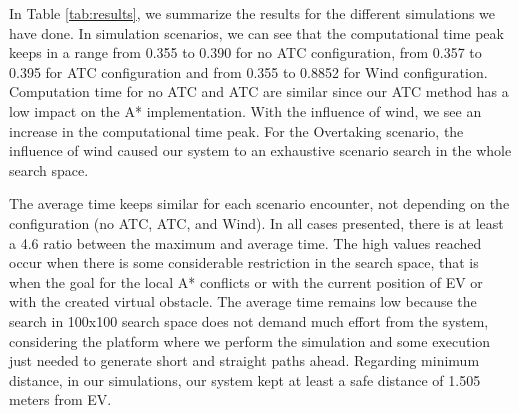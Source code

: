         In Table \ref{tab:results}, we summarize the results for the different simulations we have done. In simulation scenarios, we can see that the computational time peak keeps in a range from 0.355 to 0.390 for no \ac{ATC} configuration, from 0.357 to 0.395 for \ac{ATC} configuration and from 0.355 to 0.8852 for Wind configuration. Computation time for no \ac{ATC} and \ac{ATC} are similar since our \ac{ATC} method has a low impact on the A* implementation. With the influence of wind, we see an increase in the computational time peak. For the Overtaking scenario, the influence of wind caused our system to an exhaustive scenario search in the whole search space. 
        
        The average time keeps similar for each scenario encounter, not depending on the configuration (no \ac{ATC}, \ac{ATC}, and Wind). In all cases presented, there is at least a 4.6 ratio between the maximum and average time. The high values reached occur when there is some considerable restriction in the search space, that is when the goal for the local A* conflicts or with the current position of \ac{EV} or with the created virtual obstacle. The average time remains low because the search in 100x100 search space does not demand much effort from the system, considering the platform where we perform the simulation and some execution just needed to generate short and straight paths ahead. Regarding minimum distance, in our simulations, our system kept at least a safe distance of 1.505 meters from \ac{EV}. 
        
        


